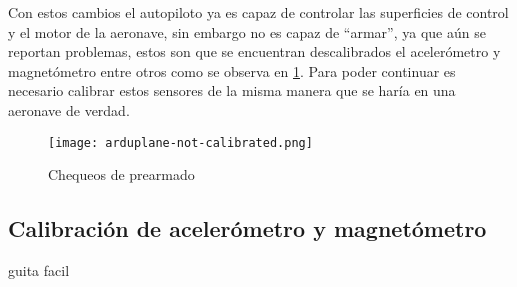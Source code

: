 Con estos cambios el autopiloto ya es capaz de controlar las superficies de control y el motor de la aeronave, sin embargo no es capaz de ``armar”, ya que aún se reportan problemas, estos son que se encuentran descalibrados el acelerómetro y magnetómetro entre otros como se observa en \cref{fig:arduplane-not-calibrated}. Para poder continuar es necesario calibrar estos sensores de la misma manera que se haría en una aeronave de verdad.

\begin{figure}[h]
    \centering
    \texttt{[image: arduplane-not-calibrated.png]}
    \caption{Chequeos de prearmado}
    \label{fig:arduplane-not-calibrated}
\end{figure}

\subsection{Calibración de acelerómetro y magnetómetro}

guita facil